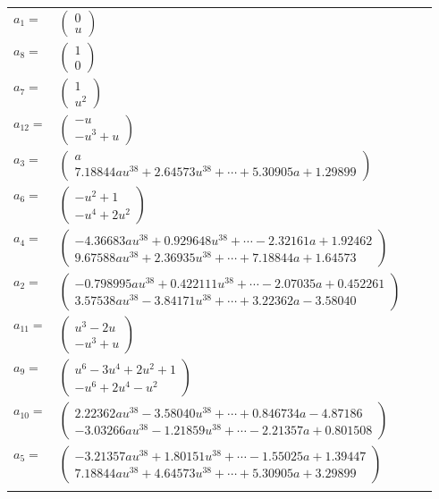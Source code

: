 \documentclass[1p]{elsarticle_modified}
\theoremstyle{definition}
\begin{document}
\begin{tabular}{m{7pt} m{180pt} m{7pt} m{180pt} }
\flushright $a_{1}=$&$\begin{pmatrix}0\\u\end{pmatrix}$ \\
\flushright $a_{8}=$&$\begin{pmatrix}1\\0\end{pmatrix}$ \\
\flushright $a_{7}=$&$\begin{pmatrix}1\\u^2\end{pmatrix}$ \\
\flushright $a_{12}=$&$\begin{pmatrix}- u\\- u^3+u\end{pmatrix}$ \\
\flushright $a_{3}=$&$\begin{pmatrix}a\\7.18844 a u^{38}+2.64573 u^{38}+\cdots+5.30905 a+1.29899\end{pmatrix}$ \\
\flushright $a_{6}=$&$\begin{pmatrix}- u^2+1\\- u^4+2 u^2\end{pmatrix}$ \\
\flushright $a_{4}=$&$\begin{pmatrix}-4.36683 a u^{38}+0.929648 u^{38}+\cdots-2.32161 a+1.92462\\9.67588 a u^{38}+2.36935 u^{38}+\cdots+7.18844 a+1.64573\end{pmatrix}$ \\
\flushright $a_{2}=$&$\begin{pmatrix}-0.798995 a u^{38}+0.422111 u^{38}+\cdots-2.07035 a+0.452261\\3.57538 a u^{38}-3.84171 u^{38}+\cdots+3.22362 a-3.58040\end{pmatrix}$ \\
\flushright $a_{11}=$&$\begin{pmatrix}u^3-2 u\\- u^3+u\end{pmatrix}$ \\
\flushright $a_{9}=$&$\begin{pmatrix}u^6-3 u^4+2 u^2+1\\- u^6+2 u^4- u^2\end{pmatrix}$ \\
\flushright $a_{10}=$&$\begin{pmatrix}2.22362 a u^{38}-3.58040 u^{38}+\cdots+0.846734 a-4.87186\\-3.03266 a u^{38}-1.21859 u^{38}+\cdots-2.21357 a+0.801508\end{pmatrix}$ \\
\flushright $a_{5}=$&$\begin{pmatrix}-3.21357 a u^{38}+1.80151 u^{38}+\cdots-1.55025 a+1.39447\\7.18844 a u^{38}+4.64573 u^{38}+\cdots+5.30905 a+3.29899\end{pmatrix}$\\&\end{tabular}
\end{document}
